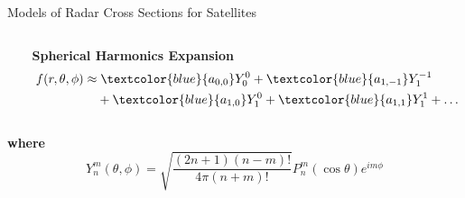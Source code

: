 % 

\begin{frame}{Models of Radar Cross Sections for Satellites}
    \centering
    \begin{columns}[c,onlytextwidth]
        \begin{column}{0.4\textwidth}
            \centering
        \end{column}

        \begin{column}{0.6\textwidth}
            \centering
            \textbf{\large Spherical Harmonics Expansion} \\[0.8em]
            \begin{align*}
                f(r, \theta, \phi) \approx & \; \textcolor{blue}{a_{0,0}} Y_0^0 
                + \textcolor{blue}{a_{1,-1}} Y_1^{-1} \\
                & + \textcolor{blue}{a_{1,0}} Y_1^0 
                + \textcolor{blue}{a_{1,1}} Y_1^1 
                + \dots
            \end{align*}
        \end{column}
    \end{columns}

    \vspace{1em}
    \textbf{where}
    \[
    Y_n^m(\theta, \phi) = 
    \sqrt{\frac{(2n + 1)(n - m)!}{4\pi (n + m)!}} P_n^m(\cos \theta) e^{im\phi}
    \]
\end{frame}

\endinput  %
